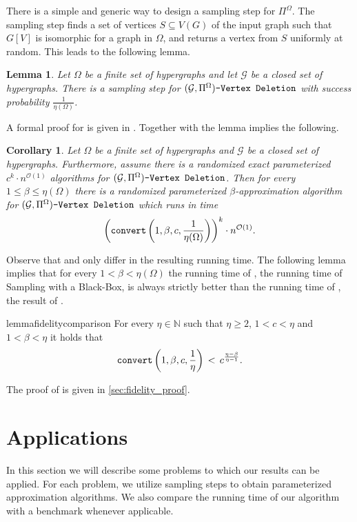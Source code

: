 \documentclass[letterpaper,11pt]{article}
\newcommand{\1}[1]{\mathds{1}\left[#1\right]}
\newcommand{\runtime}[1][\alpha, \beta, c, q]{\textnormal{\texttt{convert}}\left(#1\right)}
\newcommand{\Oh}{\mathcal{O}}
\newtheorem{lemma}[theorem]{Lemma}
\newtheorem{corollary}[theorem]{Corollary}
\newcommand{\gpivd}[1][\mathcal{G},\Pi]{(#1)\textnormal{\texttt{-Vertex Deletion}}}
\newcommand{\cG}{\mathcal{G}}
\begin{document}
There is a simple and generic way to design a sampling step for $\Pi^{\Omega}$. The sampling step finds a set of vertices $S\subseteq V(G)$  of the input graph such that $G[V]$ is isomorphic for a graph in $\Omega$, and returns a vertex from $S$ uniformly at random. This leads to the following lemma. 
\begin{lemma}\label{lemma:finite_forb_sampling}
	Let $\Omega$ be a finite set of hypergraphs and let $\cG$ be  a closed set of hypergraphs.
	There is a sampling step for $\gpivd[\mathcal{G}, \Pi^{\Omega}]$ with success probability $\frac{1}{\eta(\Omega)}$.
\end{lemma}
A formal proof for  is given in 	. Together with  the lemma implies the following. 
\begin{corollary}\label{cor:finite_forbidden}
		Let $\Omega$ be a finite set of hypergraphs and $\cG$ be  a closed set of hypergraphs. Furthermore, assume there is a randomized exact parameterized $c^k \cdot n^{\Oh(1)}$ algorithms for $\gpivd[\cG, \Pi^{\Omega}]$. Then for every $1\leq\beta\leq \eta(\Omega)$ there is a randomized parameterized $\beta$-approximation algorithm for $\gpivd[\cG, \Pi^{\Omega}]$ which runs in time $$\left(\runtime[1,\beta,c,\frac{1}{\eta(\Omega)}] \right) ^{k}\cdot n^{\Oh(1)}.$$ 
\end{corollary}

Observe that  and  only differ in the resulting running time. The following lemma implies  that for every $1<\beta<\eta(\Omega)$ the running time of , the running time of Sampling with a Black-Box, is always strictly better than the running time of , the result of \cite{Fellows2018}. 

\begin{restatable}{lemma}{fidelitycomparison}
	\label{lemma:comparison}
	For every   $\eta \in \mathbb{N}$ such that $\eta \geq 2$, $1<c<\eta$  and $1<\beta <\eta$ it holds that	
	$$\runtime[1,\beta,c,\frac{1}{\eta}] \,<\, c^{\frac{\eta-\beta}{\eta-1}}.$$
	
\end{restatable}
The proof of  is given in \cref{sec:fidelity_proof}. 

 
\section{Applications}
\label{sec:applications}
In this section we will describe some problems to which our results can be applied.
For each problem, we utilize sampling steps to obtain parameterized approximation algorithms. 
We also compare the running time of our algorithm with a benchmark whenever applicable.
\end{document}
